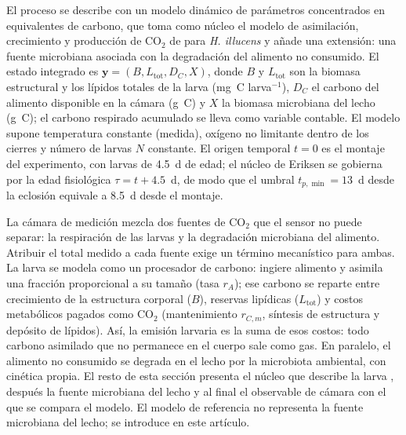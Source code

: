 
El proceso se describe con un modelo dinámico de parámetros concentrados en equivalentes de carbono, que toma como núcleo el modelo de asimilación, crecimiento y producción de CO$_2$ de \textcite{eriksenDynamicModellingFeed2022} para \textit{H. illucens} y añade una extensión: una fuente microbiana asociada con la degradación del alimento no consumido. El estado integrado es $\mathbf{y} = (B, L_{\mathrm{tot}}, D_C, X)$, donde $B$ y $L_{\mathrm{tot}}$ son la biomasa estructural y los lípidos totales de la larva (mg~C larva$^{-1}$), $D_C$ el carbono del alimento disponible en la cámara (g~C) y $X$ la biomasa microbiana del lecho (g~C); el carbono respirado acumulado se lleva como variable contable. El modelo supone temperatura constante (medida), oxígeno no limitante dentro de los cierres y número de larvas $N$ constante. El origen temporal $t = 0$ es el montaje del experimento, con larvas de 4.5~d de edad; el núcleo de Eriksen se gobierna por la edad fisiológica $\tau = t + 4.5$~d, de modo que el umbral $t_{p,\min} = 13$~d desde la eclosión equivale a 8.5~d desde el montaje.

La cámara de medición mezcla dos fuentes de CO$_2$ que el sensor no puede separar: la respiración de las larvas y la degradación microbiana del alimento. Atribuir el total medido a cada fuente exige un término mecanístico para ambas. La larva se modela como un procesador de carbono: ingiere alimento y asimila una fracción proporcional a su tamaño (tasa $r_A$); ese carbono se reparte entre crecimiento de la estructura corporal ($B$), reservas lipídicas ($L_{\mathrm{tot}}$) y costos metabólicos pagados como CO$_2$ (mantenimiento $r_{C,m}$, síntesis de estructura y depósito de lípidos). Así, la emisión larvaria es la suma de esos costos: todo carbono asimilado que no permanece en el cuerpo sale como gas. En paralelo, el alimento no consumido se degrada en el lecho por la microbiota ambiental, con cinética propia. El resto de esta sección presenta el núcleo que describe la larva \parencite{eriksenDynamicModellingFeed2022}, después la fuente microbiana del lecho y al final el observable de cámara con el que se compara el modelo. El modelo de referencia no representa la fuente microbiana del lecho; se introduce en este artículo.

